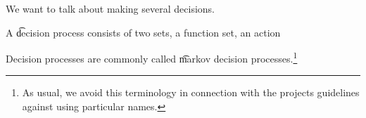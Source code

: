 

We want to talk about making several decisions.


A \t{decision process} consists of two sets, a function set, an action


Decision processes are commonly called \t{markov decision processes}.\footnote{As usual, we avoid this terminology in connection with the projects guidelines against using particular names.}

\blankpage

